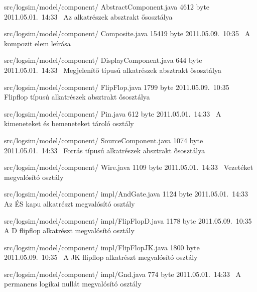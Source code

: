 \begin{fajllista}
\fajl
{src/logsim/model/component/\newline
AbstractComponent.java} %
{4612 byte} %
{2011.05.01.~14:33~} %
{Az alkatrészek absztrakt ősosztálya} %

\fajl
{src/logsim/model/component/\newline
Composite.java} %
{15419 byte} %
{2011.05.09.~10:35~} %
{A kompozit elem leírása} %

\fajl
{src/logsim/model/component/\newline
DisplayComponent.java} %
{644 byte} %
{2011.05.01.~14:33~} %
{Megjelenítő típusú alkatrészek absztrakt ősosztálya} %

\fajl
{src/logsim/model/component/\newline
FlipFlop.java} %
{1799 byte} %
{2011.05.09.~10:35~} %
{Flipflop típusú alkatrészek absztrakt ősosztálya} %

\fajl
{src/logsim/model/component/\newline
Pin.java}
{612 byte}
{2011.05.01.~14:33~}
{A kimeneteket és bemeneteket tároló osztály}

\fajl
{src/logsim/model/component/\newline
SourceComponent.java} %
{1074 byte} %
{2011.05.01.~14:33~} %
{Forrás típusú alkatrészek absztrakt ősosztálya} %

\fajl
{src/logsim/model/component/\newline
Wire.java} %
{1109 byte} %
{2011.05.01.~14:33~} %
{Vezetéket megvalósító osztály} %

\fajl
{src/logsim/model/component/\newline
impl/AndGate.java} %
{1124 byte} %
{2011.05.01.~14:33~} %
{Az ÉS kapu alkatrészt megvalósító osztály} %

\fajl
{src/logsim/model/component/\newline
impl/FlipFlopD.java} %
{1178 byte} %
{2011.05.09.~10:35~} %
{A D flipflop alkatrészt megvalósító osztály} %

\fajl
{src/logsim/model/component/\newline
impl/FlipFlopJK.java} %
{1800 byte} %
{2011.05.09.~10:35~} %
{A JK flipflop alkatrészt megvalósító osztály} %

\fajl
{src/logsim/model/component/\newline
impl/Gnd.java} %
{774 byte} %
{2011.05.01.~14:33~} %
{A permanens logikai nullát megvalósító osztály} %


\end{fajllista}

